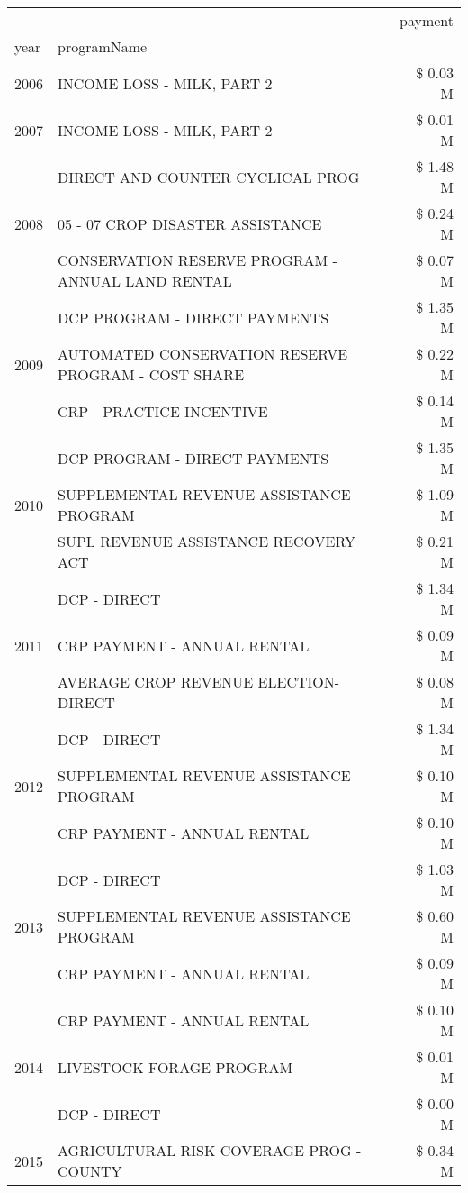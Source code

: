 \begin{tabular}{llr}
\toprule
 &  & payment \\
year & programName &  \\
\midrule
2006 & INCOME LOSS - MILK, PART 2 & \$ 0.03 M \\
\cline{1-3}
2007 & INCOME LOSS - MILK, PART 2 & \$ 0.01 M \\
\cline{1-3}
\multirow[t]{3}{*}{2008} & DIRECT AND COUNTER CYCLICAL PROG & \$ 1.48 M \\
 & 05 - 07 CROP DISASTER ASSISTANCE & \$ 0.24 M \\
 & CONSERVATION RESERVE PROGRAM - ANNUAL LAND RENTAL & \$ 0.07 M \\
\cline{1-3}
\multirow[t]{3}{*}{2009} & DCP PROGRAM - DIRECT PAYMENTS & \$ 1.35 M \\
 & AUTOMATED CONSERVATION RESERVE PROGRAM - COST SHARE & \$ 0.22 M \\
 & CRP - PRACTICE INCENTIVE & \$ 0.14 M \\
\cline{1-3}
\multirow[t]{3}{*}{2010} & DCP PROGRAM - DIRECT PAYMENTS & \$ 1.35 M \\
 & SUPPLEMENTAL REVENUE ASSISTANCE PROGRAM & \$ 1.09 M \\
 & SUPL REVENUE ASSISTANCE RECOVERY ACT & \$ 0.21 M \\
\cline{1-3}
\multirow[t]{3}{*}{2011} & DCP - DIRECT & \$ 1.34 M \\
 & CRP PAYMENT - ANNUAL RENTAL & \$ 0.09 M \\
 & AVERAGE CROP REVENUE ELECTION-DIRECT & \$ 0.08 M \\
\cline{1-3}
\multirow[t]{3}{*}{2012} & DCP - DIRECT & \$ 1.34 M \\
 & SUPPLEMENTAL REVENUE ASSISTANCE PROGRAM & \$ 0.10 M \\
 & CRP PAYMENT - ANNUAL RENTAL & \$ 0.10 M \\
\cline{1-3}
\multirow[t]{3}{*}{2013} & DCP - DIRECT & \$ 1.03 M \\
 & SUPPLEMENTAL REVENUE ASSISTANCE PROGRAM & \$ 0.60 M \\
 & CRP PAYMENT - ANNUAL RENTAL & \$ 0.09 M \\
\cline{1-3}
\multirow[t]{3}{*}{2014} & CRP PAYMENT - ANNUAL RENTAL & \$ 0.10 M \\
 & LIVESTOCK FORAGE PROGRAM & \$ 0.01 M \\
 & DCP - DIRECT & \$ 0.00 M \\
\cline{1-3}
\multirow[t]{3}{*}{2015} & AGRICULTURAL RISK COVERAGE PROG - COUNTY & \$ 0.34 M \\

\end{tabular}
